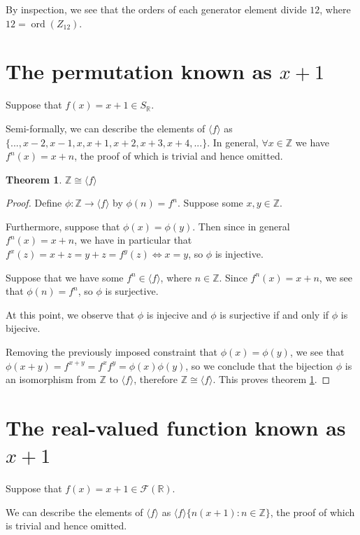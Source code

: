 \documentclass[12pt]{article}
\newcommand{\reals}{\mathbb{R}}
\newcommand{\ints}{\mathbb{Z}}
\newcommand{\ord}{\operatorname{ord}}
\newcommand{\freals}{\mathcal{F}(\reals)}
\newtheorem{thm}{Theorem}
\begin{document}
By inspection, we see that the orders of each generator element divide $12$,
where $12 = \ord(Z_{12})$.

\section{The permutation known as $x + 1$}

Suppose that $f(x) = x + 1 \in S_\reals$.

Semi-formally, we can describe the elements of $\langle f \rangle$
as $\{ ..., x - 2, x - 1, x, x + 1, x + 2, x + 3, x + 4, ... \}$.
In general, $\forall x \in \ints$ we have $f^n(x) = x + n$,
the proof of which is trivial and hence omitted.

\begin{thm} \label{thm7}
	$\ints \cong \langle f \rangle$
\end{thm}

\begin{proof}
	Define $\phi: \ints \to \langle f \rangle$
	by $\phi(n) = f^n$.
	Suppose some $x,y \in \ints$.
	
	Furthermore, suppose that $\phi(x) = \phi(y)$.
	Then since in general $f^n(x) = x + n$,
	we have in particular that $f^x(z) = x + z = y + z = f^y(z) \iff x = y$,
	so $\phi$ is injective.

	Suppose that we have some $f^n \in \langle f \rangle$,
	where $n \in \ints$.
	Since $f^n(x) = x + n$,
	we see that $\phi(n) = f^n$,
	so $\phi$ is surjective.

	At this point,
	we observe that
	$\phi$ is injecive
	and $\phi$ is surjective
	if and only if
	$\phi$ is bijecive.

	Removing the previously imposed constraint
	that $\phi(x) = \phi(y)$,
	we see that $\phi(x + y) = f^{x + y} = f^xf^y = \phi(x)\phi(y)$,
	so we conclude that the bijection $\phi$
	is an isomorphism from $\ints$ to $\langle f \rangle$,
	therefore $\ints \cong \langle f \rangle$.
	This proves theorem \ref{thm7}.
\end{proof}

\section{The real-valued function known as $x + 1$}

Suppose that $f(x) = x + 1 \in \freals$.

We can describe the elements of $\langle f \rangle$
as $\langle f \rangle \{ n(x + 1):n \in \ints \}$,
the proof of which is trivial and hence omitted.
\end{document}
